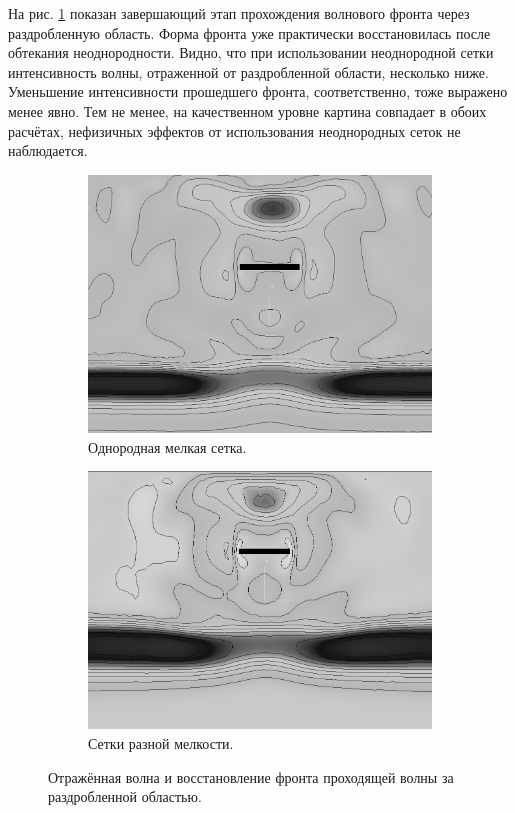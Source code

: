 На рис. \ref{pic:crack_final_front} показан завершающий этап прохождения волнового фронта через раздробленную область. Форма фронта уже практически восстановилась после обтекания неоднородности. Видно, что при использовании неоднородной сетки интенсивность волны, отраженной от раздробленной области, несколько ниже. Уменьшение интенсивности прошедшего фронта, соответственно, тоже выражено менее явно. Тем не менее, на качественном уровне картина совпадает в обоих расчётах, нефизичных эффектов от использования неоднородных сеток не наблюдается.

\begin{figure}[htp]
\begin{subfigure}[b]{0.5\textwidth}
\centering
\includegraphics[width=\textwidth]{png/wave-around-crack/final-front-uniform-mesh.png}
\caption{Однородная мелкая сетка.}
\end{subfigure}
\begin{subfigure}[b]{0.5\textwidth}
\centering
\includegraphics[width=\textwidth]{png/wave-around-crack/final-front-non-uniform-mesh.png}
\caption{Сетки разной мелкости.}
\end{subfigure}
\caption{Отражённая волна и восстановление фронта проходящей волны за раздробленной областью.}
\label{pic:crack_final_front}
\end{figure}


